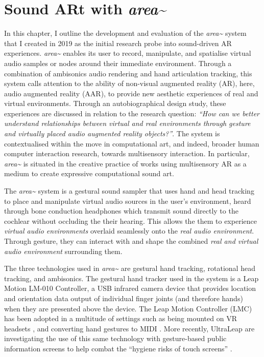 \section{Sound ARt with \textit{area\textasciitilde{}}} \label{sec: area-intro}
In this chapter, I outline the development and evaluation of the \textit{area\textasciitilde{}} system that I created in 2019 as the initial research probe into sound-driven AR experiences. \textit{area\textasciitilde{}} enables its user to record, manipulate, and spatialise virtual audio samples or nodes around their immediate environment. Through a combination of ambisonics audio rendering and hand articulation tracking, this system calls attention to the ability of non-visual augmented reality (AR), here, audio augmented reality (AAR), to provide new aesthetic experiences of real and virtual environments.
Through an autobiographical design study, these experiences are discussed in relation to the research question: \textit{“How can we better understand relationships between virtual and real environments through gesture and virtually placed audio augmented reality objects?”}. The system is contextualised within the move in computational art, and indeed, broader human computer interaction research, towards multisensory interaction. In particular, \textit{area\textasciitilde{}} is situated in the creative practice of works using multisensory AR as a medium to create expressive computational sound art.

The \textit{area\textasciitilde{}} system is a gestural sound sampler that uses hand and head tracking to place and manipulate virtual audio sources in the user’s environment, heard through bone conduction headphones which transmit sound directly to the cochlear without occluding the their hearing. This allows the them to experience \textit{virtual audio environments} overlaid seamlessly onto the \textit{real audio environment}. Through gesture, they can interact with and shape the combined \textit{real and virtual audio environment} surrounding them.

The three technologies used in \textit{area\textasciitilde{}} are gestural hand tracking, rotational head tracking, and ambisonics. The gestural hand tracker used in the system is a Leap Motion LM-010 Controller, a USB infrared camera device that provides location and orientation data output of individual finger joints (and therefore hands) when they are presented above the device. The Leap Motion Controller (LMC) has been adopted in a multitude of settings such as being mounted on VR headsets \citep{leapmotion2016}, and converting hand gestures to MIDI \citep{leapmotion2017}. More recently, UltraLeap are investigating the use of this same technology with gesture-based public information screens to help combat the “hygiene risks of touch screens” \citeyearpar{ultraleap2020a}.

